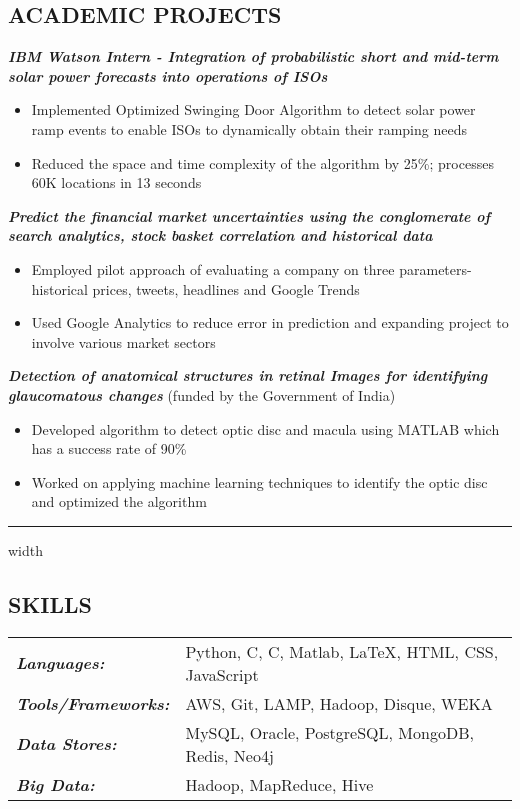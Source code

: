 \documentclass[10.5pt]{article}
\newenvironment{subs}
  {\adjustwidth{1em}{0pt}}
  {\endadjustwidth}
\newcommand{\CPP}
{C\nolinebreak[4]\hspace{-.05em}\raisebox{.22ex}{\footnotesize\bf ++}}
\begin{document}
\subsection*{\textbf{ACADEMIC PROJECTS}}
\begin{subs}
\vspace{-3pt}
{\it {\bf IBM Watson Intern - Integration of probabilistic short and mid-term solar power forecasts into operations of ISOs}}
\begin{itemize}[noitemsep,topsep=0pt]
\item Implemented Optimized Swinging Door Algorithm to detect solar power ramp events to enable ISOs to dynamically obtain their ramping needs
\item Reduced the space and time complexity of the algorithm by 25\%;  processes 60K locations in 13 seconds
\end{itemize}
\vspace{3pt}
{\it {\bf Predict the financial market uncertainties using the conglomerate of search analytics, stock basket correlation and historical data}}
\begin{itemize}[noitemsep,topsep=0pt]
\item Employed pilot approach of evaluating a company on three parameters- historical prices, tweets, headlines and Google Trends
\item Used Google Analytics to reduce error in prediction and expanding project to involve various market sectors
\end{itemize}
\vspace{3pt}
{\it {\bf Detection of anatomical structures in retinal Images for identifying glaucomatous changes}} ({\small funded by the Government of India})
\begin{itemize}[noitemsep,topsep=0pt]
\item Developed algorithm to detect optic disc and macula using MATLAB which has a success rate of 90\%
\item Worked on applying machine learning techniques to identify the optic disc and optimized the algorithm
\end{itemize}
\end{subs}

\vspace{0.6em}
\normalsize
\hrule width \hsize \kern 0.5mm
\vspace{-10pt}
\subsection*{\textbf{SKILLS}}
\vspace{-12pt}
\begin{longtable}{ l p{6.2in} } %
{\it {\bf Languages: }} & Python, C, \CPP, Matlab, \LaTeX, HTML, CSS, JavaScript
	\\{\it {\bf Tools/Frameworks: }} & AWS, Git, LAMP, Hadoop, Disque, WEKA
	\\{\it {\bf Data Stores: }} & MySQL, Oracle, PostgreSQL, MongoDB, Redis, Neo4j
	\\{\it {\bf Big Data: }} & Hadoop, MapReduce, Hive
\end{longtable}
\end{document}
